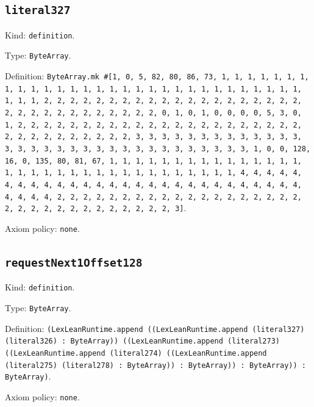 \documentclass[11pt]{article}
\begin{document}
\subsection*{\texttt{literal327}}
\noindent Kind: \texttt{definition}.\par
\noindent Type: \texttt{ByteArray}.\par
\noindent Definition: \texttt{ByteArray.mk \#[1, 0, 5, 82, 80, 86, 73, 1, 1, 1, 1, 1, 1, 1, 1, 1, 1, 1, 1, 1, 1, 1, 1, 1, 1, 1, 1, 1, 1, 1, 1, 1, 1, 1, 1, 1, 1, 1, 1, 1, 2, 2, 2, 2, 2, 2, 2, 2, 2, 2, 2, 2, 2, 2, 2, 2, 2, 2, 2, 2, 2, 2, 2, 2, 2, 2, 2, 2, 2, 2, 2, 2, 0, 1, 0, 1, 0, 0, 0, 0, 5, 3, 0, 1, 2, 2, 2, 2, 2, 2, 2, 2, 2, 2, 2, 2, 2, 2, 2, 2, 2, 2, 2, 2, 2, 2, 2, 2, 2, 2, 2, 2, 2, 2, 2, 2, 3, 3, 3, 3, 3, 3, 3, 3, 3, 3, 3, 3, 3, 3, 3, 3, 3, 3, 3, 3, 3, 3, 3, 3, 3, 3, 3, 3, 3, 3, 3, 3, 1, 0, 0, 128, 16, 0, 135, 80, 81, 67, 1, 1, 1, 1, 1, 1, 1, 1, 1, 1, 1, 1, 1, 1, 1, 1, 1, 1, 1, 1, 1, 1, 1, 1, 1, 1, 1, 1, 1, 1, 1, 1, 1, 4, 4, 4, 4, 4, 4, 4, 4, 4, 4, 4, 4, 4, 4, 4, 4, 4, 4, 4, 4, 4, 4, 4, 4, 4, 4, 4, 4, 4, 4, 4, 4, 2, 2, 2, 2, 2, 2, 2, 2, 2, 2, 2, 2, 2, 2, 2, 2, 2, 2, 2, 2, 2, 2, 2, 2, 2, 2, 2, 2, 2, 2, 2, 2, 3]}.\par
\noindent Axiom policy: \texttt{none}.\par
\subsection*{\texttt{requestNext1Offset128}}
\noindent Kind: \texttt{definition}.\par
\noindent Type: \texttt{ByteArray}.\par
\noindent Definition: \texttt{(LexLeanRuntime.append ((LexLeanRuntime.append (literal327) (literal326) : ByteArray)) ((LexLeanRuntime.append (literal273) ((LexLeanRuntime.append (literal274) ((LexLeanRuntime.append (literal275) (literal278) : ByteArray)) : ByteArray)) : ByteArray)) : ByteArray)}.\par
\noindent Axiom policy: \texttt{none}.\par
\end{document}
